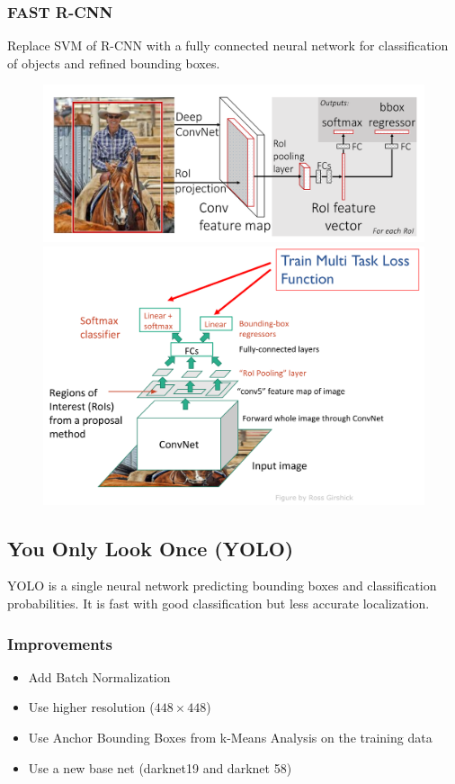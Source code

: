 \subsubsection{FAST R-CNN}
Replace SVM of R-CNN with a fully connected neural network for classification of objects and refined bounding boxes.

\begin{figure}[h]
	\centering
	\includegraphics[width=0.7\linewidth]{img/fast_r-cnn_structure}
	\includegraphics[width=0.7\linewidth]{img/fast_r-cnn_structure2}
\end{figure}

\subsection{You Only Look Once (YOLO)}
YOLO is a single neural network predicting bounding boxes and classification probabilities.
It is fast with good classification but less accurate localization.

\subsubsection{Improvements}
\begin{itemize}
	\item Add Batch Normalization
	\item Use higher resolution ($448\times 448$)
	\item Use Anchor Bounding Boxes from k-Means Analysis on the training data
	\item Use a new base net (darknet19 and darknet 58)
\end{itemize}

